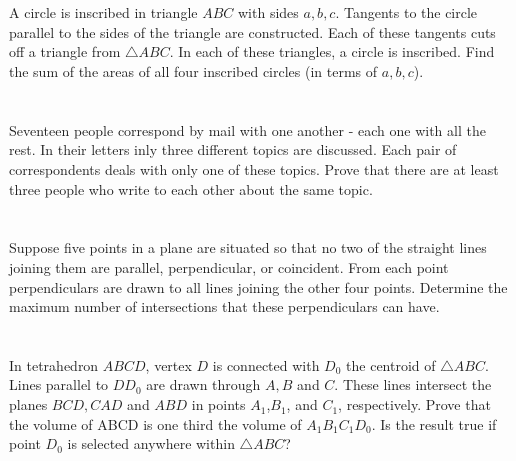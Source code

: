 \documentclass[12pt,a4paper]{article}
\begin{document}
\section{}
A circle is inscribed in triangle $ABC$ with sides $a,b,c$. Tangents to the circle parallel to the sides of the triangle are constructed. Each of these tangents cuts off a triangle from $\triangle ABC$. In each of these triangles, a circle is inscribed. Find the sum of the areas of all four inscribed circles (in terms of $a,b,c$).

\section{}
Seventeen people correspond by mail with one another - each one with all the rest. In their letters inly three different topics are discussed. Each pair of correspondents deals with only one of these topics. Prove that there are at least three people who write to each other about the same topic.

\section{}
Suppose five points in a plane are situated so that no two of the straight lines joining them are parallel, perpendicular, or coincident. From each point perpendiculars are drawn to all lines joining the other four points. Determine the maximum number of intersections that these perpendiculars can have.

\section{}
In tetrahedron $ABCD$, vertex $D$ is connected with $D_0$ the centroid of $\triangle ABC$. Lines parallel to $DD_0$ are drawn through $A, B$ and $C$. These lines intersect the planes $BCD,CAD$ and $ABD$ in points $A_1$,$B_1$, and $C_1$, respectively. Prove that the volume of ABCD is one third the volume of $A_1B_1C_1D_0$. Is the result true if point $D_0$ is selected anywhere within $\triangle ABC$?
\end{document}
